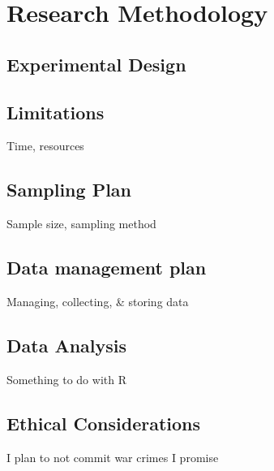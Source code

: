 \section{Research Methodology}

\subsection{Experimental Design}

\subsection{Limitations}

Time, resources

\subsection{Sampling Plan}

Sample size, sampling method

\subsection{Data management plan}

Managing, collecting, \& storing data

\subsection{Data Analysis}

Something to do with R

\subsection{Ethical Considerations}

I plan to not commit war crimes I promise